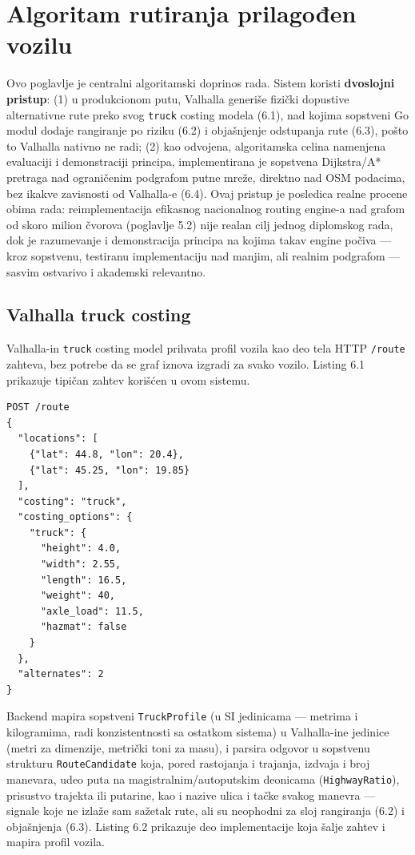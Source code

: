\chapter{Algoritam rutiranja prilagođen vozilu}

Ovo poglavlje je centralni algoritamski doprinos rada. Sistem koristi \textbf{dvoslojni pristup}: (1) u produkcionom putu, Valhalla generiše fizički dopustive alternativne rute preko svog \texttt{truck} costing modela (6.1), nad kojima sopstveni Go modul dodaje rangiranje po riziku (6.2) i objašnjenje odstupanja rute (6.3), pošto to Valhalla nativno ne radi; (2) kao odvojena, algoritamska celina namenjena evaluaciji i demonstraciji principa, implementirana je sopstvena Dijkstra/A* pretraga nad ograničenim podgrafom putne mreže, direktno nad OSM podacima, bez ikakve zavisnosti od Valhalla-e (6.4). Ovaj pristup je posledica realne procene obima rada: reimplementacija efikasnog nacionalnog routing engine-a nad grafom od skoro milion čvorova (poglavlje 5.2) nije realan cilj jednog diplomskog rada, dok je razumevanje i demonstracija principa na kojima takav engine počiva — kroz sopstvenu, testiranu implementaciju nad manjim, ali realnim podgrafom — sasvim ostvarivo i akademski relevantno.

\section{Valhalla truck costing}

Valhalla-in \texttt{truck} costing model prihvata profil vozila kao deo tela HTTP \texttt{/route} zahteva, bez potrebe da se graf iznova izgradi za svako vozilo. Listing 6.1 prikazuje tipičan zahtev korišćen u ovom sistemu.

\newpage
\begin{lstlisting}[caption={[Zahtev za truck-costed rutu sa alternativama]Zahtev za truck-costed rutu sa alternativama (visina/širina/dužina u metrima, masa/osovinsko opterećenje u tonama)}]
POST /route
{
  "locations": [
    {"lat": 44.8, "lon": 20.4},
    {"lat": 45.25, "lon": 19.85}
  ],
  "costing": "truck",
  "costing_options": {
    "truck": {
      "height": 4.0,
      "width": 2.55,
      "length": 16.5,
      "weight": 40,
      "axle_load": 11.5,
      "hazmat": false
    }
  },
  "alternates": 2
}
\end{lstlisting}

Backend mapira sopstveni \texttt{TruckProfile} (u SI jedinicama — metrima i kilogramima, radi konzistentnosti sa ostatkom sistema) u Valhalla-ine jedinice (metri za dimenzije, metrički toni za masu), i parsira odgovor u sopstvenu strukturu \texttt{RouteCandidate} koja, pored rastojanja i trajanja, izdvaja i broj manevara, udeo puta na magistralnim/autoputskim deonicama (\texttt{HighwayRatio}), prisustvo trajekta ili putarine, kao i nazive ulica i tačke svakog manevra — signale koje ne izlaže sam sažetak rute, ali su neophodni za sloj rangiranja (6.2) i objašnjenja (6.3). Listing 6.2 prikazuje deo implementacije koja šalje zahtev i mapira profil vozila.


